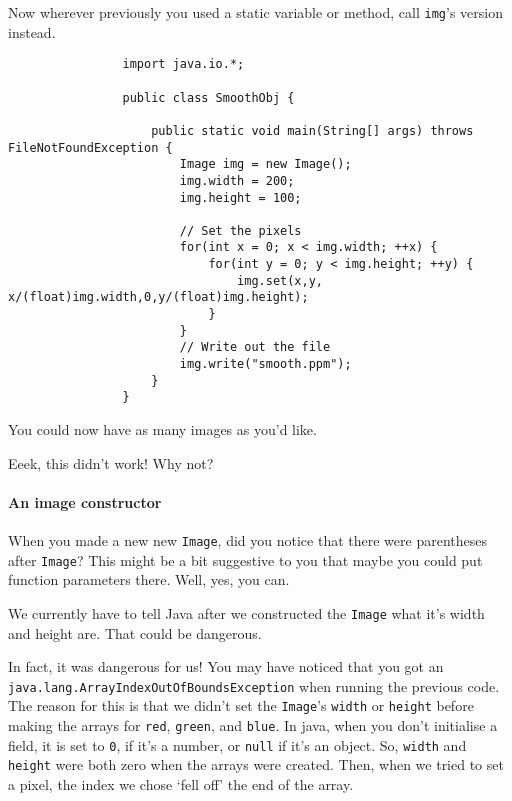 \documentclass{article}
\begin{document}
            Now wherever previously you used a static variable or method, call \texttt{img}'s version instead.     
            
            \begin{verbatim}
                import java.io.*;

                public class SmoothObj {

                    public static void main(String[] args) throws FileNotFoundException {
                        Image img = new Image();
                        img.width = 200;
                        img.height = 100;
                        
                        // Set the pixels
                        for(int x = 0; x < img.width; ++x) {
                            for(int y = 0; y < img.height; ++y) {
                                img.set(x,y, x/(float)img.width,0,y/(float)img.height);
                            }
                        }
                        // Write out the file
                        img.write("smooth.ppm");
                    }
                }
            \end{verbatim}
                    
            You could now have as many images as you'd like.
            
            Eeek, this didn't work!  Why not?

        \paragraph{An image constructor}
            When you made a new new \texttt{Image}, did you notice that there were parentheses after \texttt{Image}? This might be a bit
            suggestive to you that maybe you could put function parameters there.  Well, yes, you can.
            
            We currently have to tell Java after we constructed the \texttt{Image} what it's width and height are.  That could be dangerous.
            
            In fact, it was dangerous for us! You may have noticed that you got an \texttt{java.lang.ArrayIndexOutOfBoundsException} when
            running the previous code. The reason for this is that we didn't set the \texttt{Image}'s \texttt{width} or \texttt{height}
            before making the arrays for \texttt{red}, \texttt{green}, and \texttt{blue}. In java, when you don't initialise a field, it is
            set to \texttt{0}, if it's a number, or \texttt{null} if it's an object. So, \texttt{width} and \texttt{height} were both zero
            when the arrays were created. Then, when we tried to set a pixel, the index we chose `fell off' the end of the array.
            
\end{document}
